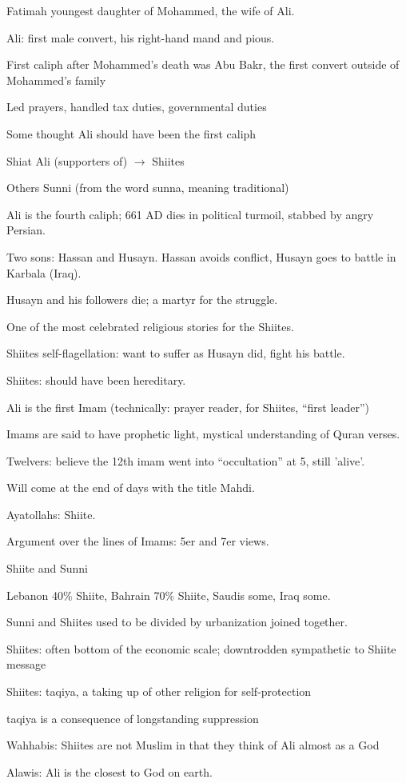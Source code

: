 \documentclass[12pt]{article}
\begin{document}
Fatimah youngest daughter of Mohammed, the wife of Ali.

Ali: first male convert, his right-hand mand and pious.

First caliph after Mohammed's death was Abu Bakr, the first convert outside of Mohammed's family

Led prayers, handled tax duties, governmental duties

Some thought Ali should have been the first caliph

Shiat Ali (supporters of) $\to$ Shiites

Others Sunni (from the word sunna, meaning traditional)

Ali is the fourth caliph; 661 AD dies in political turmoil, stabbed by angry Persian.

Two sons: Hassan and Husayn.  Hassan avoids conflict, Husayn goes to battle in Karbala (Iraq).

Husayn and his followers die; a martyr for the struggle.

One of the most celebrated religious stories for the Shiites.

Shiites self-flagellation: want to suffer as Husayn did, fight his battle.

Shiites: should have been hereditary.

Ali is the first Imam (technically: prayer reader, for Shiites, ``first leader'')

Imams are said to have prophetic light, mystical understanding of Quran verses.

Twelvers: believe the 12th imam went into ``occultation'' at 5, still 'alive'.

Will come at the end of days with the title Mahdi.

Ayatollahs: Shiite.

Argument over the lines of Imams: 5er and 7er views.

\noindent
Shiite and Sunni

Lebanon 40\% Shiite, Bahrain 70\% Shiite, Saudis some, Iraq some.

Sunni and Shiites used to be divided by urbanization joined together.

Shiites: often bottom of the economic scale; downtrodden sympathetic to Shiite message

Shiites: taqiya, a taking up of other religion for self-protection

taqiya is a consequence of longstanding suppression

Wahhabis: Shiites are not Muslim in that they think of Ali almost as a God

Alawis: Ali is the closest to God on earth.
\end{document}
